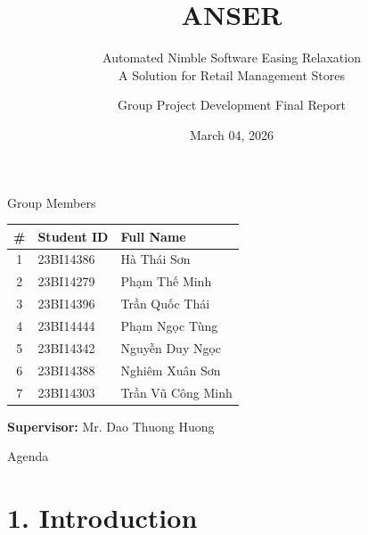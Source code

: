 \documentclass[10pt]{beamer}
\title[ANSER]{ANSER}
\subtitle{Automated Nimble Software Easing Relaxation \\ A Solution for Retail Management Stores}
\author[Group Project]{Group Project Development Final Report}
\institute[USTH]{University of Science and Technology of Hanoi}
\date[March 04, 2026]{March 04, 2026} %
\begin{document}
\begin{frame}
    \titlepage
\end{frame}

\begin{frame}{Group Members}
    \centering
    \vspace{0.3cm}
    \begin{tabular}{c l l}
        \textbf{\#} & \textbf{Student ID} & \textbf{Full Name} \\
        \hline
        \rule{0pt}{2.5ex}1 & 23BI14386 & Hà Thái Sơn \\
        2 & 23BI14279 & Phạm Thế Minh \\
        3 & 23BI14396 & Trần Quốc Thái \\
        4 & 23BI14444 & Phạm Ngọc Tùng \\
        5 & 23BI14342 & Nguyễn Duy Ngọc \\
        6 & 23BI14388 & Nghiêm Xuân Sơn \\
        7 & 23BI14303 & Trần Vũ Công Minh \\
    \end{tabular}
    \vspace{0.5cm}
    
    \textbf{Supervisor:} Mr. Dao Thuong Huong
\end{frame}

\begin{frame}{Agenda}
    
    \tableofcontents
\end{frame}

\section{1. Introduction}
\end{document}
